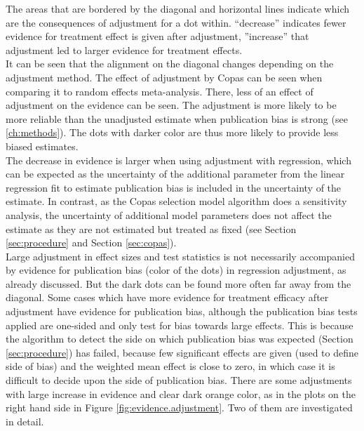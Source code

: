 \documentclass[11pt,a4paper,twoside]{book}\usepackage[]{graphicx}\usepackage[]{color}
\begin{document}

The areas that are bordered by the diagonal and horizontal lines indicate which are the consequences of adjustment for a dot within. ``decrease'' indicates fewer evidence for treatment effect is given after adjustment, ''increase'' that adjustment led to larger evidence for treatment effects. \\
It can be seen that the alignment on the diagonal changes depending on the adjustment method. The effect of adjustment by Copas can be seen when comparing it to random effects meta-analysis. There, less of an effect of adjustment on the evidence can be seen. The adjustment is more likely to be more reliable than the unadjusted estimate when publication bias is strong (see \ref{ch:methods}). The dots with darker color are thus more likely to provide less biased estimates.\\
The decrease in evidence is larger when using adjustment with regression, which can be expected as the uncertainty of the additional parameter from the linear regression fit to estimate publication bias is included in the uncertainty of the estimate. In contrast, as the Copas selection model algorithm does a sensitivity analysis, the uncertainty of additional model parameters does not affect the estimate as they are not estimated but treated as fixed (see Section \ref{sec:procedure} and Section \ref{sec:copas}).\\
Large adjustment in effect sizes and test statistics is not necessarily accompanied by evidence for publication bias (color of the dots) in regression adjustment, as already discussed. But the dark dots can be found more often far away from the diagonal. Some cases which have more evidence for treatment efficacy after adjustment have evidence for publication bias, although the publication bias tests applied are one-sided and only test for bias towards large effects. This is because the algorithm to detect the side on which publication bias was expected (Section \ref{sec:procedure}) has failed, \eg because few significant effects are given (used to define side of bias) and the weighted mean effect is close to zero, in which case it is difficult to decide upon the side of publication bias. There are some adjustments with large increase in evidence and clear dark orange color, as in the plots on the right hand side in Figure \ref{fig:evidence.adjustment}. Two of them are investigated in detail.
\end{document}
